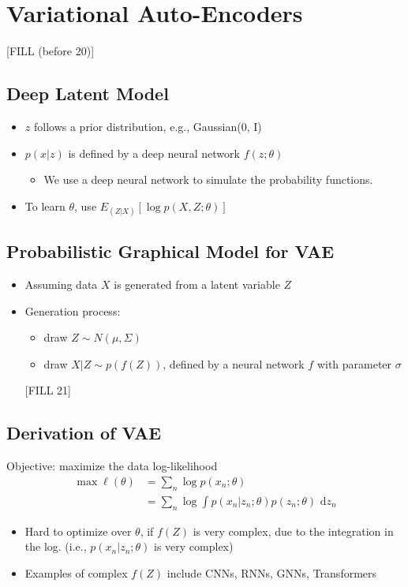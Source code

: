 \documentclass[10pt]{article}
\begin{document}
\section*{Variational Auto-Encoders}
[FILL (before 20)]
\subsection*{Deep Latent Model}
\begin{itemize}
	\item $z$ follows a prior distribution, e.g., Gaussian(0, I)
	\item $p(x | z)$ is defined by a deep neural network $f(z; \theta)$
	\begin{itemize}
	    \item We use a deep neural network to simulate the probability functions.
    \end{itemize}
	\item To learn $\theta$, use $E_{(Z|X)} [\log p(X, Z;\theta)]$
\end{itemize}

\subsection*{Probabilistic Graphical Model for VAE}
\begin{itemize}
	\item Assuming data $X$ is generated from a latent variable $Z$
	\item Generation process:
	\begin{itemize}
	    \item draw $Z \sim N(\mu, \Sigma)$
	    \item draw $X | Z \sim p(f(Z))$, defined by a neural network $f$ with parameter $\sigma$
    \end{itemize}
    \begin{center} 
        [FILL 21]
    \end{center}
\end{itemize}

\subsection*{Derivation of VAE}
Objective: maximize the data log-likelihood
\begin{align*}
    \max \ell(\theta) &= \sum_n \log p(x_n; \theta) \\
    &= \sum_n \log \int p(x_n | z_n; \theta) p(z_n; \theta) \text{ d} z_n
\end{align*}
\begin{itemize}
	\item Hard to optimize over $\theta$, if $f(Z)$ is very complex, due to the integration in the log.  (i.e., $p(x_n | z_n; \theta)$ is very complex)
	\item Examples of complex $f(Z)$ include CNNs, RNNs, GNNs, Transformers
\end{itemize}
\end{document}
